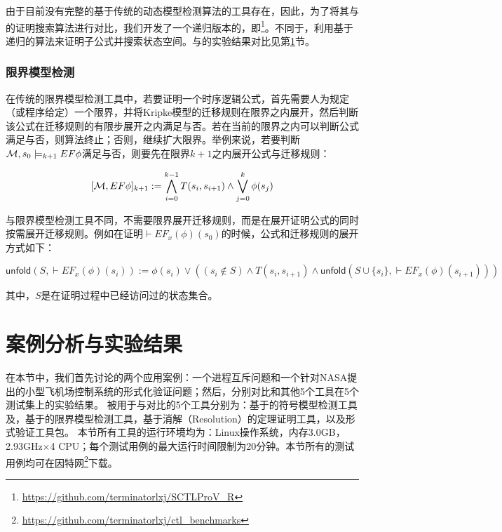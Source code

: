 由于目前没有完整的基于传统的动态模型检测算法的工具存在，因此，为了将其与\sctlprov{}的证明搜索算法进行对比，我们开发了一个递归版本的\sctlprov{}，即\sctlprovr{}\footnote{\url{https://github.com/terminatorlxj/SCTLProV_R}}。不同于\sctlprov{}，\sctlprovr{}利用基于递归的算法来证明子公式并搜索状态空间。\sctlprov{}与\sctlprovr{}的实验结果对比见第\ref{sec:case_exp}节。

\subsubsection{限界模型检测}
在传统的限界模型检测工具中，若要证明一个时序逻辑公式，首先需要人为规定（或程序给定）一个限界，并将Kripke模型的迁移规则在限界之内展开，然后判断该公式在迁移规则的有限步展开之内满足与否。若在当前的限界之内可以判断公式满足与否，则算法终止；否则，继续扩大限界。举例来说，若要判断${\cal M}, s_0 \models_{k+1} EF\phi$满足与否，则要先在限界$k+1$之内展开公式与迁移规则\cite{BCCZ99}：

\begin{small}
	$$ [{\cal M},EF\phi]_{k+1} := \bigwedge^{k-1}_{i=0}T(s_i,s_{i+1}) \wedge \bigvee_{j=0}^k\phi(s_j)$$
\end{small}

与限界模型检测工具不同，\sctlprov{}不需要限界展开迁移规则，而是在展开证明公式的同时按需展开迁移规则。例如在证明$\vdash EF_x(\phi)(s_0)$的时候，公式和迁移规则的展开方式如下：

\begin{center}{\small
		$
		\textsf{unfold}(S,\vdash EF_x(\phi)(s_i)) := 
		\phi(s_i) \vee ((s_i\notin S) \wedge T(s_i, s_{i+1}) \wedge 
		\textsf{unfold}(S\cup \{s_i\},\vdash EF_x(\phi)(s_{i+1})))
		$
	}
\end{center}
其中，$S$是在证明过程中已经访问过的状态集合。


\section{案例分析与实验结果}\label{sec:case_exp}

在本节中，我们首先讨论\sctlprov{}的两个应用案例：一个进程互斥问题和一个针对NASA提出的小型飞机场控制系统的形式化验证问题；然后，分别对比\sctlprov{}和其他5个工具在5个测试集上的实验结果。
被用于与\sctlprov{}对比的5个工具分别为：基于\BDD{}的符号模型检测工具\nusmv{}及\nuxmv，基于\QBF{}的限界模型检测工具\verds{}，基于消解（Resolution）的定理证明工具，以及形式验证工具包\CADP{}。
本节所有工具的运行环境均为：Linux操作系统，内存3.0GB，2.93GHz$\times$4 CPU；每个测试用例的最大运行时间限制为20分钟。本节所有的测试用例均可在因特网\footnote{\url{https://github.com/terminatorlxj/ctl_benchmarks}}下载。



